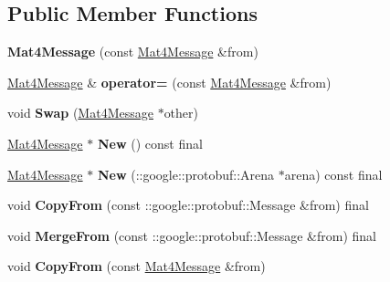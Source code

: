 \subsection*{Public Member Functions}
\begin{DoxyCompactItemize}
\item 
\mbox{\label{classtbMath_1_1Mat4Message_a5263d94fcff2dbc0e2f63a2a567f2506}} 
{\bfseries Mat4\+Message} (const \hyperlink{classtbMath_1_1Mat4Message}{Mat4\+Message} \&from)
\item 
\mbox{\label{classtbMath_1_1Mat4Message_ac1e519a0bad8a42eaf58e4bafb3877c9}} 
\hyperlink{classtbMath_1_1Mat4Message}{Mat4\+Message} \& {\bfseries operator=} (const \hyperlink{classtbMath_1_1Mat4Message}{Mat4\+Message} \&from)
\item 
\mbox{\label{classtbMath_1_1Mat4Message_a1702ab313b26f941d2661843d522c6ba}} 
void {\bfseries Swap} (\hyperlink{classtbMath_1_1Mat4Message}{Mat4\+Message} $\ast$other)
\item 
\mbox{\label{classtbMath_1_1Mat4Message_af0eea443d30932a7a7621168db3cfaf5}} 
\hyperlink{classtbMath_1_1Mat4Message}{Mat4\+Message} $\ast$ {\bfseries New} () const final
\item 
\mbox{\label{classtbMath_1_1Mat4Message_afd182f5a71801f8a403be4f3a86df33a}} 
\hyperlink{classtbMath_1_1Mat4Message}{Mat4\+Message} $\ast$ {\bfseries New} (\+::google\+::protobuf\+::\+Arena $\ast$arena) const final
\item 
\mbox{\label{classtbMath_1_1Mat4Message_a8744f2e9d4f2e161c2d3ed614510adc6}} 
void {\bfseries Copy\+From} (const \+::google\+::protobuf\+::\+Message \&from) final
\item 
\mbox{\label{classtbMath_1_1Mat4Message_af2d968e1912b7a698e3aafaebd656477}} 
void {\bfseries Merge\+From} (const \+::google\+::protobuf\+::\+Message \&from) final
\item 
\mbox{\label{classtbMath_1_1Mat4Message_a8944ea6dfb199e3587b96cb00601b293}} 
void {\bfseries Copy\+From} (const \hyperlink{classtbMath_1_1Mat4Message}{Mat4\+Message} \&from)

\end{DoxyCompactItemize}
